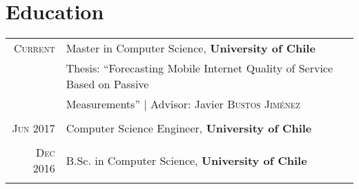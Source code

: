 \documentclass[a4paper,10pt]{article}
\begin{document}
\section{Education}
\begin{tabular}{rl}	
\textsc{Current}& Master in Computer Science, \textbf{University of Chile}\\
& Thesis: ``Forecasting Mobile Internet Quality of Service Based on Passive \\&Measurements'' | \small Advisor: Javier \textsc{Bustos Jiménez}\\
&\\
\textsc{Jun} 2017& Computer Science Engineer, \textbf{University of Chile}\\&\\
\textsc{Dec} 2016& B.Sc. in Computer Science, \textbf{University of Chile}\\&\\

\end{tabular}

\end{document}
